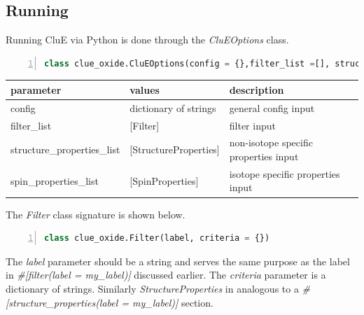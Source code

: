 \documentclass{book}
\begin{document}
\subsection{Running}
Running CluE via Python is done through the \textit{CluEOptions} class.
\begin{lstlisting}[frame=single,numbers=left,language=python]
class clue_oxide.CluEOptions(config = {},filter_list =[], structure_properties_list = [], spin_properties_list = [])
\end{lstlisting}

\begin{center}
\begin{tabular}{| m{12em} | m{3.5cm}| m{7cm} |}
 \hline 
 \textbf{parameter} & \textbf{values} & \textbf{description} \\ 
 \hline
 config & dictionary of strings & general config input\\
 \hline
 filter\_list & [Filter] & filter input\\ 
 \hline
 structure\_properties\_list & [StructureProperties] & 
 non-isotope specific properties input\\ 
 \hline
 spin\_properties\_list & [SpinProperties] & 
 isotope specific properties input\\ 
 \hline 
\end{tabular}
\end{center}
The \textit{Filter} class signature is shown below.
\begin{lstlisting}[frame=single,numbers=left,language=python]
class clue_oxide.Filter(label, criteria = {})
\end{lstlisting}
The \textit{label} parameter should be a string and serves the same purpose as 
the label in \textit{\#[filter(label = my\_label)]} discussed earlier.
The \textit{criteria} parameter is a dictionary of strings.
Similarly \textit{StructureProperties} in analogous to a 
\textit{\#[structure\_properties(label = my\_label)]} section.
\end{document}
